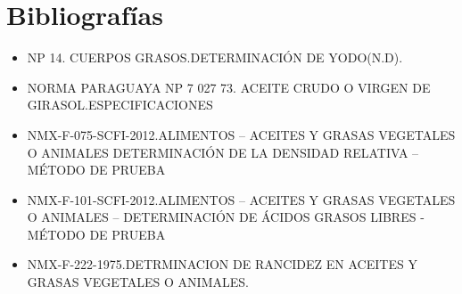 \documentclass[a4paper,12pt]{article} %
\begin{document}
\newpage
\section {Bibliografías}
\begin{itemize}
    \item {NP 14. CUERPOS GRASOS.DETERMINACIÓN DE YODO(N.D).}
    \item {NORMA PARAGUAYA NP 7 027 73. ACEITE CRUDO O VIRGEN DE GIRASOL.ESPECIFICACIONES}
    \item{NMX-F-075-SCFI-2012.ALIMENTOS – ACEITES Y GRASAS VEGETALES O ANIMALES DETERMINACIÓN DE LA DENSIDAD RELATIVA – MÉTODO DE PRUEBA}
    \item{NMX-F-101-SCFI-2012.ALIMENTOS – ACEITES Y GRASAS VEGETALES O ANIMALES – DETERMINACIÓN DE ÁCIDOS GRASOS LIBRES - MÉTODO DE PRUEBA }
    \item{NMX-F-222-1975.DETRMINACION DE RANCIDEZ EN ACEITES Y
GRASAS VEGETALES O ANIMALES.}
   
\end{itemize}



\printbibliography[
heading=bibintoc,
title={Bibliografías}
]
\end{document}
